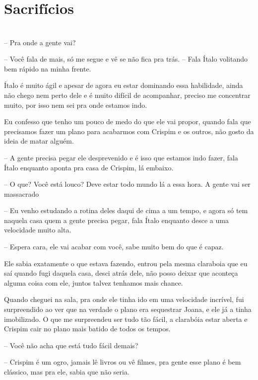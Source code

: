 
\newpage


\ifdefined\useChapters
\chapter{Sacrifícios}

\else
\chapter{}
\fi
-- Pra onde a gente vai?

-- Você fala de mais, só me segue e vê se não fica pra trás. -- Fala Ítalo volitando bem rápido na minha frente.

Ítalo é muito ágil e apesar de agora eu estar dominando essa habilidade, ainda não chego nem perto dele e é muito difícil de acompanhar, preciso me concentrar muito, por isso nem sei pra onde estamos indo.

Eu confesso que tenho um pouco de medo do que ele vai propor, quando fala que precisamos fazer um plano para acabarmos com Crispim e os outros, não gosto da ideia de matar alguém.

-- A gente precisa pegar ele desprevenido e é isso que estamos indo fazer, fala Ítalo enquanto aponta pra casa de Crispim, lá embaixo.

-- O que? Você está louco? Deve estar todo mundo lá a essa hora. A gente vai ser massacrado

-- Eu venho estudando a rotina deles daqui de cima a um tempo, e agora só tem naquela casa quem a gente precisa pegar, fala Ítalo enquanto desce a uma velocidade muito alta.

-- Espera cara, ele vai acabar com você, sabe muito bem do que é capaz.

Ele sabia exatamente o que estava fazendo, entrou pela mesma claraboia que eu saí quando fugi daquela casa, desci atrás dele, não posso deixar que aconteça alguma coisa com ele, juntos talvez tenhamos mais chance.

Quando cheguei na sala, pra onde ele tinha ido em uma velocidade incrível, fui surpreendido ao ver que na verdade o plano era sequestrar Joana, e ele já a tinha imobilizado. O que me surpreendeu ser tudo tão fácil, a clarabóia estar aberta e Crispim cair no plano mais batido de todos os tempos.

-- Você não acha que está tudo fácil demais?

-- Crispim é um ogro, jamais lê livros ou vê filmes, pra gente esse plano é bem clássico, mas pra ele, sabia que não seria.

